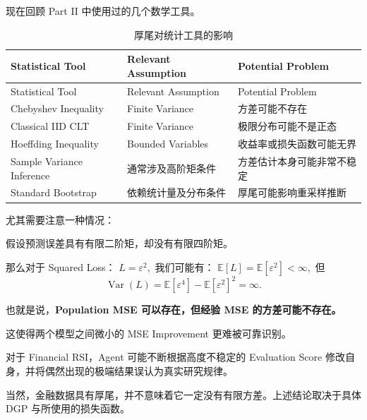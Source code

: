 现在回顾 Part II 中使用过的几个数学工具。

\begin{readertable}\setlength{\LTcapwidth}{.85\linewidth}
\begin{longtable}[]{@{}
  >{\raggedright\arraybackslash}p{}
  >{\raggedright\arraybackslash}p{}
  >{\raggedright\arraybackslash}p{}@{}}
\caption{厚尾对统计工具的影响}\tabularnewline
\toprule
Statistical Tool & Relevant Assumption & Potential Problem \\
\midrule
\endfirsthead
\toprule
Statistical Tool & Relevant Assumption & Potential Problem \\
\midrule
\endhead
Chebyshev Inequality & Finite Variance & 方差可能不存在 \\
Classical IID CLT & Finite Variance & 极限分布可能不是正态 \\
Hoeffding Inequality & Bounded Variables & 收益率或损失函数可能无界 \\
Sample Variance Inference & 通常涉及高阶矩条件 & 方差估计本身可能非常不稳定 \\
Standard Bootstrap & 依赖统计量及分布条件 & 厚尾可能影响重采样推断 \\
\bottomrule
\end{longtable}
\end{readertable}

尤其需要注意一种情况：

假设预测误差具有有限二阶矩，却没有有限四阶矩。

那么对于 Squared Loss： \(L=\varepsilon^2,\) 我们可能有： \(\mathbb E[L]=\mathbb E[\varepsilon^2]<\infty,\) 但  \[\operatorname{Var}(L)
=
\mathbb E[\varepsilon^4]
-\mathbb E[\varepsilon^2]^2
=\infty.\]

也就是说，\textbf{Population MSE 可以存在，但经验 MSE 的方差可能不存在。}

这使得两个模型之间微小的 MSE Improvement 更难被可靠识别。

对于 Financial RSI，Agent 可能不断根据高度不稳定的 Evaluation Score 修改自身，并将偶然出现的极端结果误认为真实研究规律。

当然，金融数据具有厚尾，并不意味着它一定没有有限方差。上述结论取决于具体 DGP 与所使用的损失函数。
